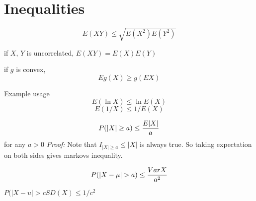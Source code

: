 \section{Inequalities}
\begin{slide}

	$$E(XY) \leq \sqrt{E(X^2)E(Y^2)}$$

if $X$, $Y$ is uncorrelated, $E(XY) = E(X)E(Y)$

\end{slide}
 
\begin{slide}

if $g$ is convex,$$E g(X) \geq g(EX)$$

Example usage
$$E(\ln X)\leq \ln E(X)$$
$$E(1/X) \leq 1/E(X)$$
\end{slide}

\begin{slide}

$$P(|X|\geq a) \leq {E|X| \over a }$$ for any $a > 0$
\emph{Proof:}
Note that $I_{|X|\geq a} \leq |X|$ is always true. So taking expectation on both sides gives markovs inequality.

\end{slide}

\begin{slide}

$$P(|X -\mu| > a) \leq {Var X \over a^2}$$

$P(|X-u| >cSD(X) \leq 1/c^2$

\end{slide}
